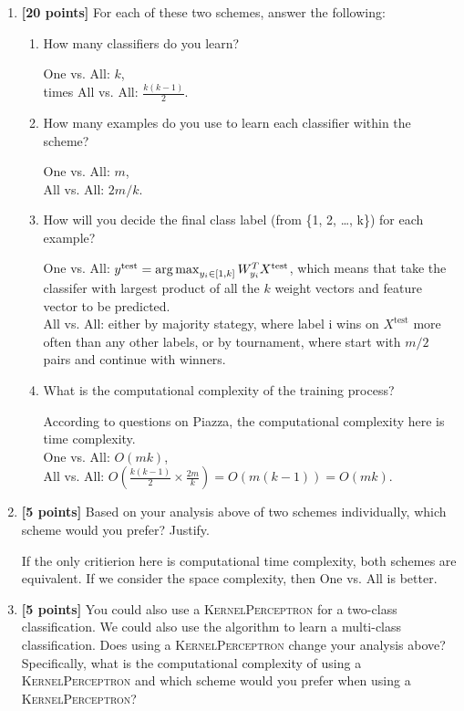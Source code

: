 \documentclass[11pt]{article}
\begin{document}
\begin{enumerate}
\item {\bf [20 points]} For each of these two schemes, answer the following:
\begin{enumerate}
\item How many classifiers do you learn?

One vs. All: $k$, \\times
All vs. All: $\frac{k(k-1)}{2}.$
\item How many examples do you use to learn each classifier within the scheme?

One vs. All: $m$, \\
All vs. All: $2m/k.$
\item How will you decide the final class label (from \{1, 2, \ldots, k\}) for each example?

One vs. All: $y^\text{test} = \operatorname*{arg\,max}_{y_i \in [1, k]}{W_{y_i}^T X^{\text{test}}}$, which means that take the classifer with largest product of all the $k$ weight vectors and feature vector to be predicted. \\
All vs. All: either by majority stategy, where label i wins on $X^{\text{test}}$ more often than any other labels, or by tournament, where start with $m/2$ pairs and continue with winners.
\item What is the computational complexity of the training process?

According to questions on Piazza, the computational complexity here is time complexity.\\
One vs. All: $O\left(mk\right)$, \\
All vs. All: $O\left(\frac{k(k-1)}{2}\times \frac{2m}{k}\right) = O\left(m(k-1)\right) = O\left(mk\right). $
\end{enumerate}
\item {\bf [5 points]} Based on your analysis above of two schemes individually, which scheme would you prefer? Justify.

If the only critierion here is computational time complexity, both schemes are equivalent. If we consider the space complexity, then One vs. All is better.
\item {\bf [5 points]} You could also use a \textsc{KernelPerceptron} for a two-class classification. We could also use the algorithm to learn a multi-class classification. Does using a \textsc{KernelPerceptron} change your analysis above? Specifically, what is the computational complexity of using a \textsc{KernelPerceptron} and which scheme would you prefer when using a \textsc{KernelPerceptron}? 


\end{enumerate}
\end{document}
